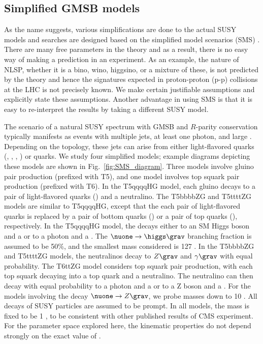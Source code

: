 \subsection{Simplified GMSB models}
As the name suggests, various simplifications are done to the actual SUSY models and searches are designed based on the simplified model scenarios (SMS) \cite{bib-sms-1,bib-sms-2,bib-sms-3,bib-sms-4,Chatrchyan:2013sza}. There are many free parameters in the theory and as a result, there is no easy way of making a prediction in an experiment. As an example, the nature of NLSP, whether it is a bino, wino, higgsino, or a mixture of these, is not predicted by the theory and hence the signatures expected in proton-proton (p-p) collisions at the LHC is not precisely known. We make certain justifiable assumptions and explicitly state these assumptions. Another advantage in using SMS is that it is easy to re-interpret the results by taking a different SUSY model.

The scenario of a natural SUSY spectrum with GMSB and $R$-parity conservation typically manifests as events with multiple jets, at least one photon, and large \ptmiss. Depending on the topology, these jets can arise from either light-flavored quarks (\cPqu, \cPqd, \cPqs, \cPqc) or {\cPqb} quarks. We study four simplified models; example diagrams depicting these models are shown in Fig.~\ref{fig:SMS_diagram}.
Three models involve gluino pair production (prefixed with T5), and one model involves top squark pair production (prefixed with T6).
In the T5qqqqHG model, each gluino decays to a pair of light-flavored quarks (\qqbar) and a neutralino.  The T5bbbbZG and T5ttttZG models are similar to T5qqqqHG, except that the each pair of light-flavored quarks is replaced by a pair of bottom quarks (\bbbar) or a pair of top quarks (\ttbar), respectively. In the T5qqqqHG model, the \nuone decays either to an SM Higgs boson and a \grav or to a photon and a .  The $\nuone\to\higgs\grav$ branching fraction is assumed to be 50\%, and the smallest \nuone mass considered is 127 \gev. In the T5bbbbZG and T5ttttZG models, the neutralinos decay to $Z\grav$ and $\gamma\grav$ with equal probability. The T6ttZG model considers top squark pair production, with each top squark decaying into a top quark and a neutralino. The neutralino can then decay with equal probability to a photon and a \grav or to a Z boson and a \grav. For the models involving the decay $\nuone\to Z\grav$, we probe \nuone masses down to 10 \gev. All decays of SUSY particles are assumed to be prompt. In all models, the mass \grav is fixed to be 1 \gev, to be consistent with other published results of CMS experiment. For the parameter space explored here, the kinematic properties do not depend strongly on the exact value of \grav.

